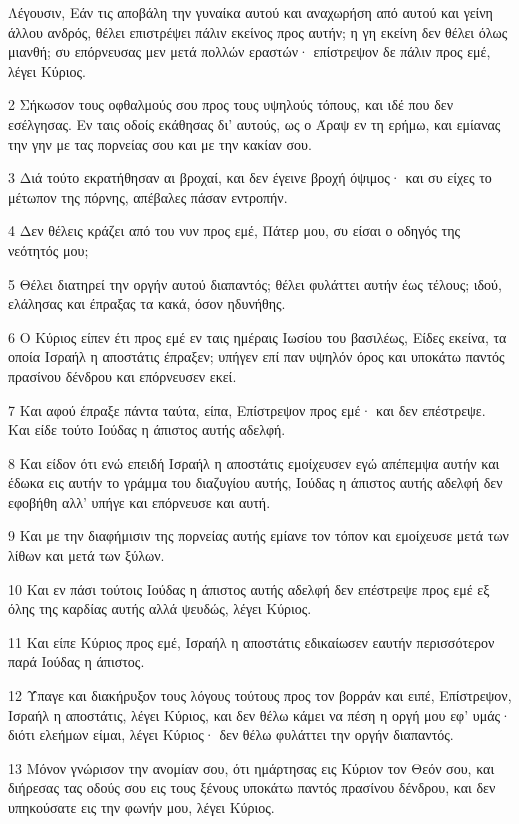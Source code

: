 \par Λέγουσιν, Εάν τις αποβάλη την γυναίκα αυτού και αναχωρήση από αυτού και γείνη άλλου ανδρός, θέλει επιστρέψει πάλιν εκείνος προς αυτήν; η γη εκείνη δεν θέλει όλως μιανθή; συ επόρνευσας μεν μετά πολλών εραστών· επίστρεψον δε πάλιν προς εμέ, λέγει Κύριος.
\par 2 Σήκωσον τους οφθαλμούς σου προς τους υψηλούς τόπους, και ιδέ που δεν εσέλγησας. Εν ταις οδοίς εκάθησας δι' αυτούς, ως ο Άραψ εν τη ερήμω, και εμίανας την γην με τας πορνείας σου και με την κακίαν σου.
\par 3 Διά τούτο εκρατήθησαν αι βροχαί, και δεν έγεινε βροχή όψιμος· και συ είχες το μέτωπον της πόρνης, απέβαλες πάσαν εντροπήν.
\par 4 Δεν θέλεις κράζει από του νυν προς εμέ, Πάτερ μου, συ είσαι ο οδηγός της νεότητός μου;
\par 5 Θέλει διατηρεί την οργήν αυτού διαπαντός; θέλει φυλάττει αυτήν έως τέλους; ιδού, ελάλησας και έπραξας τα κακά, όσον ηδυνήθης.
\par 6 Ο Κύριος είπεν έτι προς εμέ εν ταις ημέραις Ιωσίου του βασιλέως, Είδες εκείνα, τα οποία Ισραήλ η αποστάτις έπραξεν; υπήγεν επί παν υψηλόν όρος και υποκάτω παντός πρασίνου δένδρου και επόρνευσεν εκεί.
\par 7 Και αφού έπραξε πάντα ταύτα, είπα, Επίστρεψον προς εμέ· και δεν επέστρεψε. Και είδε τούτο Ιούδας η άπιστος αυτής αδελφή.
\par 8 Και είδον ότι ενώ επειδή Ισραήλ η αποστάτις εμοίχευσεν εγώ απέπεμψα αυτήν και έδωκα εις αυτήν το γράμμα του διαζυγίου αυτής, Ιούδας η άπιστος αυτής αδελφή δεν εφοβήθη αλλ' υπήγε και επόρνευσε και αυτή.
\par 9 Και με την διαφήμισιν της πορνείας αυτής εμίανε τον τόπον και εμοίχευσε μετά των λίθων και μετά των ξύλων.
\par 10 Και εν πάσι τούτοις Ιούδας η άπιστος αυτής αδελφή δεν επέστρεψε προς εμέ εξ όλης της καρδίας αυτής αλλά ψευδώς, λέγει Κύριος.
\par 11 Και είπε Κύριος προς εμέ, Ισραήλ η αποστάτις εδικαίωσεν εαυτήν περισσότερον παρά Ιούδας η άπιστος.
\par 12 Ύπαγε και διακήρυξον τους λόγους τούτους προς τον βορράν και ειπέ, Επίστρεψον, Ισραήλ η αποστάτις, λέγει Κύριος, και δεν θέλω κάμει να πέση η οργή μου εφ' υμάς· διότι ελεήμων είμαι, λέγει Κύριος· δεν θέλω φυλάττει την οργήν διαπαντός.
\par 13 Μόνον γνώρισον την ανομίαν σου, ότι ημάρτησας εις Κύριον τον Θεόν σου, και διήρεσας τας οδούς σου εις τους ξένους υποκάτω παντός πρασίνου δένδρου, και δεν υπηκούσατε εις την φωνήν μου, λέγει Κύριος.
